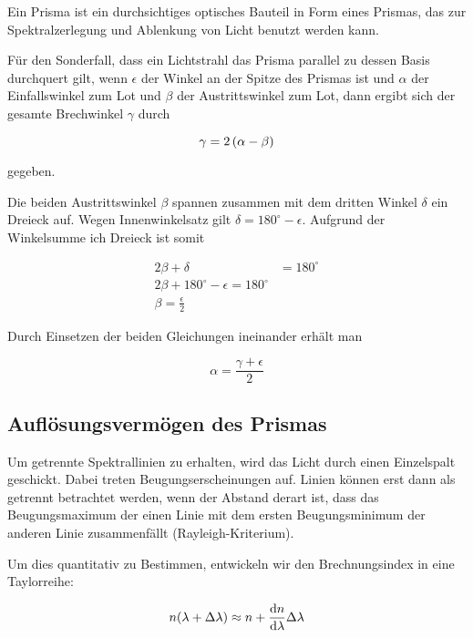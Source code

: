 \documentclass[a4paper,german,12pt,smallheadings]{scrartcl}
\begin{document}
Ein Prisma ist ein durchsichtiges optisches Bauteil in Form eines Prismas, das
zur Spektralzerlegung und Ablenkung von Licht benutzt werden kann.

Für den Sonderfall, dass ein Lichtstrahl das Prisma parallel zu dessen Basis
durchquert gilt, wenn $\epsilon$ der Winkel an der Spitze des Prismas ist und
$\alpha$ der Einfallswinkel zum Lot und $\beta$ der Austrittswinkel zum Lot,
dann ergibt sich der gesamte Brechwinkel $\gamma$ durch

\begin{equation}
  \gamma = 2 \del{\alpha - \beta}
\end{equation}

gegeben.

Die beiden Austrittswinkel $\beta$ spannen zusammen mit dem dritten Winkel
$\delta$ ein Dreieck auf. Wegen Innenwinkelsatz gilt $\delta = 180^\circ -
\epsilon$. Aufgrund der Winkelsumme ich Dreieck ist somit

\begin{align*}
  2 \beta + \delta &= 180^\circ \\
  2 \beta + 180^\circ - \epsilon = 180^\circ \\
  \beta = \frac{\epsilon}{2}
\end{align*}

Durch Einsetzen der beiden Gleichungen ineinander erhält man

\begin{equation}
  \alpha = \frac{\gamma + \epsilon}{2}
\end{equation}

\subsection{Auflösungsvermögen des Prismas}

Um getrennte Spektrallinien zu erhalten, wird das Licht durch einen Einzelspalt
geschickt. Dabei treten Beugungserscheinungen auf. Linien können erst dann als
getrennt betrachtet werden, wenn der Abstand derart ist, dass das
Beugungsmaximum der einen Linie mit dem ersten Beugungsminimum der anderen
Linie zusammenfällt (Rayleigh-Kriterium).

Um dies quantitativ zu Bestimmen, entwickeln wir den Brechnungsindex in eine
Taylorreihe:

\begin{equation}
  n(\lambda + \Delta \lambda) \approx n + \frac{\dif n}{\dif \lambda} \Delta \lambda
\end{equation}
\end{document}
